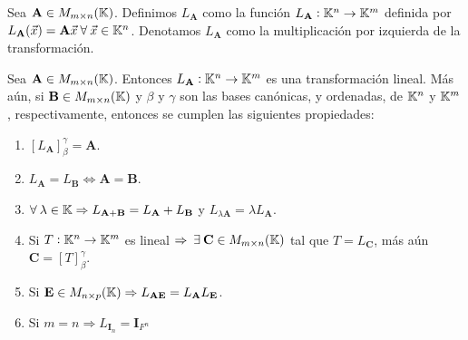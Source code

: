 \begin{definition} 
    Sea $\textbf{A} \in M_{m\times n}(\mathbb{K})$. Definimos $L_{\textbf{A}}$ como la función $L_{\textbf{A}}:\mathbb{K}^n\to \mathbb{K}^m$ definida por $L_{\textbf{A}}(\vec{x})=\textbf{A}\vec{x} \: \forall \:\vec{x} \in \mathbb{K}^n$. Denotamos $L_{\textbf{A}}$ como la multiplicación por izquierda de la transformación.
\end{definition}

\begin{theorem} \label{theomlmm}
    Sea $\textbf{A} \in M_{m\times n}(\mathbb{K})$. Entonces $L_{\textbf{A}}:\mathbb{K}^n\to \mathbb{K}^m$ es una transformación lineal. Más aún, si $\textbf{B} \in M_{m \times n}(\mathbb{K})$ y $\beta$ y $\gamma$ son las bases canónicas, y ordenadas, de $\mathbb{K}^n$ y $\mathbb{K}^m$, respectivamente, entonces se cumplen las siguientes propiedades:
    \begin{enumerate}
        \item $[L_{\textbf{A}}]_{\beta}^{\gamma}=\textbf{A}$.
        \item $L_{\textbf{A}}=L_{\textbf{B}} \iff \textbf{A}=\textbf{B}$.
        \item $\forall \: \lambda \in \mathbb{K} \Rightarrow L_{\textbf{A}+\textbf{B}}=L_{\textbf{A}}+L_{\textbf{B}}$ y $L_{\lambda \textbf{A}}=\lambda L_{\textbf{A}}$.
        \item Si $T:\mathbb{K}^n \to \mathbb{K}^m$ es lineal $\Rightarrow \: \exists \: \textbf{C} \in M_{m\times n}(\mathbb{K})$ tal que $T=L_{\textbf{C}}$, más aún $\textbf{C}=[T]^{\gamma}_{\beta}$.
        \item Si $\textbf{E} \in M_{n \times p}(\mathbb{K}) \Rightarrow L_{\textbf{AE}}=L_{\textbf{A}} L_{\textbf{E}}$.
        \item Si $m=n \Rightarrow L_{\textbf{I}_n}= \textbf{I}_{F^n}$
    \end{enumerate}
\end{theorem}


